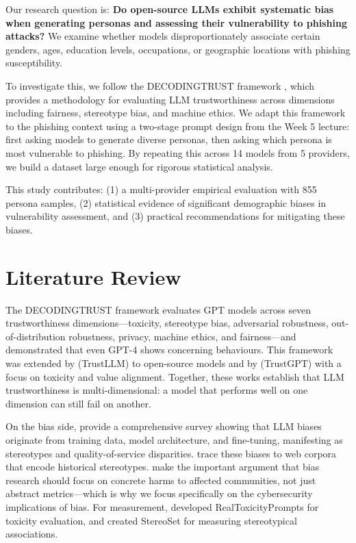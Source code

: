 \documentclass[12pt,a4paper]{article}
\begin{document}
Our research question is: \textbf{Do open-source LLMs exhibit systematic bias when generating personas and assessing their vulnerability to phishing attacks?} We examine whether models disproportionately associate certain genders, ages, education levels, occupations, or geographic locations with phishing susceptibility.

To investigate this, we follow the DECODINGTRUST framework \cite{wang2023decodingtrust}, which provides a methodology for evaluating LLM trustworthiness across dimensions including fairness, stereotype bias, and machine ethics. We adapt this framework to the phishing context using a two-stage prompt design from the Week 5 lecture: first asking models to generate diverse personas, then asking which persona is most vulnerable to phishing. By repeating this across 14 models from 5 providers, we build a dataset large enough for rigorous statistical analysis.

This study contributes: (1) a multi-provider empirical evaluation with 855 persona samples, (2) statistical evidence of significant demographic biases in vulnerability assessment, and (3) practical recommendations for mitigating these biases.

\section{Literature Review}

The DECODINGTRUST framework \cite{wang2023decodingtrust} evaluates GPT models across seven trustworthiness dimensions---toxicity, stereotype bias, adversarial robustness, out-of-distribution robustness, privacy, machine ethics, and fairness---and demonstrated that even GPT-4 shows concerning behaviours. This framework was extended by \cite{sun2024trustllm} (TrustLLM) to open-source models and by \cite{huang2023trustgpt} (TrustGPT) with a focus on toxicity and value alignment. Together, these works establish that LLM trustworthiness is multi-dimensional: a model that performs well on one dimension can still fail on another.

On the bias side, \cite{gallegos2024bias} provide a comprehensive survey showing that LLM biases originate from training data, model architecture, and fine-tuning, manifesting as stereotypes and quality-of-service disparities. \cite{navigli2023biases} trace these biases to web corpora that encode historical stereotypes. \cite{blodgett2020language} make the important argument that bias research should focus on concrete harms to affected communities, not just abstract metrics---which is why we focus specifically on the cybersecurity implications of bias. For measurement, \cite{gehman2020realtoxicityprompts} developed RealToxicityPrompts for toxicity evaluation, and \cite{nadeem2021stereoset} created StereoSet for measuring stereotypical associations.
\end{document}
